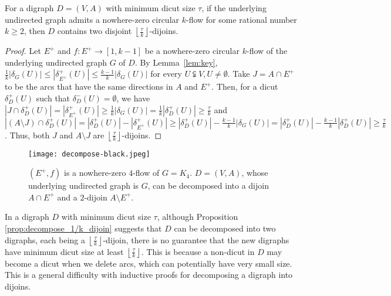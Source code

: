 \documentclass[runningheads]{llncs}
\newcommand{\rounddown}[1]{\left\lfloor#1\right\rfloor}
\begin{document}
\begin{proposition}\label{prop:decompose_1/k_dijoin}
    For a digraph $D=(V,A)$ with minimum dicut size $\tau$, if the underlying undirected graph admits a nowhere-zero circular $k$-flow for some rational number $k\geq 2$, then $D$ contains two disjoint $\rounddown{\frac{\tau}{k}}$-dijoins.
\end{proposition}
\begin{proof}
    Let $E^+$ and $f:E^+\rightarrow[1,k-1]$ be a nowhere-zero circular $k$-flow of the underlying undirected graph $G$ of $D$.
    By Lemma~\ref{lem:key}, $\frac{1}{k}|\delta_{G}(U)|\leq |\delta^+_{E^+}(U)|\leq \frac{k-1}{k}|\delta_{G}(U)|$ for every $U \subsetneqq V, U\neq\emptyset$.
    Take $J=A\cap E^+$ to be the arcs that have the same directions in $A$ and $E^+$. Then, for a dicut $\delta^+_D(U)$ such that $\delta_D^-(U)=\emptyset$, we have $|J\cap \delta_D^+(U)|=|\delta_{E^+}^+(U)|\geq \frac{1}{k}|\delta_{G}(U)|= \frac{1}{k}|\delta_{D}^+(U)|\geq \frac{\tau}{k}$ and $|(A\setminus J)\cap \delta_D^+(U)|=|\delta_D^+(U)|-|\delta_{E^+}^+(U)|\geq  |\delta_D^+(U)|-\frac{k-1}{k}|\delta_{G}(U)| = |\delta_D^+(U)|-\frac{k-1}{k}|\delta_{D}^+(U)|\geq \frac{\tau}{k}$. Thus, both $J$ and $A\setminus J$ are $\rounddown{\frac{\tau}{k}}$-dijoins.
\end{proof}

    \begin{figure}[htbp]
\centering
     \texttt{[image: decompose-black.jpeg]}
 \vspace{-1em}
 \caption{$(E^+,f)$ is a nowhere-zero $4$-flow of $G=K_4$. $D=(V,A)$, whose underlying undirected graph is $G$, can be decomposed into a dijoin $A\cap E^+$ and a $2$-dijoin $A\setminus E^+$.}
 \label{fig:decompose}
    \end{figure}



\bigskip
In a digraph $D$ with minimum dicut size $\tau$, although Proposition \ref{prop:decompose_1/k_dijoin} suggests that $D$ can be decomposed into two digraphs, each being a $\rounddown{\frac{\tau}{k}}$-dijoin, there is no guarantee that the new digraphs have minimum dicut size at least $\rounddown{\frac{\tau}{k}}$. This is because a non-dicut in $D$ may become a dicut when we delete arcs, which can potentially have very small size. This is a general difficulty with inductive proofs for decomposing a digraph into dijoins. 
\end{document}
